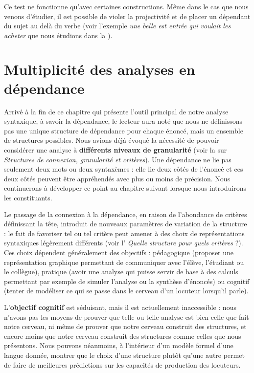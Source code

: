 Ce test ne fonctionne qu’avec certaines constructions. Même dans le cas que nous venons d’étudier, il est possible de violer la projectivité et de placer un dépendant du sujet au delà du verbe (voir l’exemple \textit{une belle est entrée qui voulait les acheter} que nous étudions dans la ).

\section{Multiplicité des analyses en dépendance}\label{sec:3.3.33}

Arrivé à la fin de ce chapitre qui présente l’outil principal de notre analyse syntaxique, à savoir la dépendance, le lecteur aura noté que nous ne définissons pas une unique structure de dépendance pour chaque énoncé, mais un ensemble de structures possibles. Nous avions déjà évoqué la nécessité de pouvoir considérer une analyse à \textbf{différents niveaux de granularité} (voir la  sur \textit{Structures de connexion, granularité et critères}). Une dépendance ne lie pas seulement deux mots ou deux syntaxèmes : elle lie deux côtés de l’énoncé et ces deux côtés peuvent être appréhendés avec plus ou moins de précision. Nous continuerons à développer ce point au chapitre suivant lorsque nous introduirons les constituants.

Le passage de la connexion à la dépendance, en raison de l’abondance de critères définissant la tête, introduit de nouveaux paramètres de variation de la structure : le fait de favoriser tel ou tel critère peut amener à des choix de représentations syntaxiques légèrement différents (voir l’ \textit{Quelle structure pour quels critères} ?). Ces choix dépendent généralement des objectifs : pédagogique (proposer une représentation graphique permettant de communiquer avec l’élève, l’étudiant ou le collègue), pratique (avoir une analyse qui puisse servir de base à des calculs permettant par exemple de simuler l’analyse ou la synthèse d’énoncés) ou cognitif (tenter de modéliser ce qui se passe dans le cerveau d’un locuteur lorsqu’il parle).

L’\textbf{objectif cognitif} est séduisant, mais il est actuellement inaccessible : nous n’avons pas les moyens de prouver que telle ou telle analyse est bien celle que fait notre cerveau, ni même de prouver que notre cerveau construit des structures, et encore moins que notre cerveau construit des structures comme celles que nous présentons. Nous pouvons néanmoins, à l’intérieur d’un modèle formel d’une langue donnée, montrer que le choix d’une structure plutôt qu’une autre permet de faire de meilleures prédictions sur les capacités de production des locuteurs.

